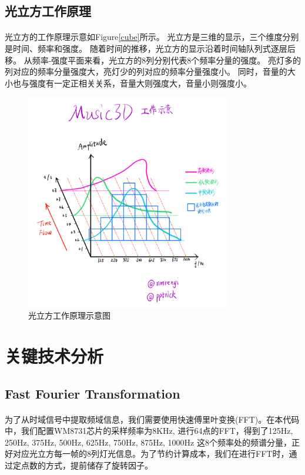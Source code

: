 \documentclass[12pt]{article}
\begin{document}
\subsection{光立方工作原理}
\paragraph{}
光立方的工作原理示意如Figure\eqref{cube}所示。
光立方是三维的显示，三个维度分别是时间、频率和强度。
随着时间的推移，光立方的显示沿着时间轴队列式逐层后移。
从频率-强度平面来看，光立方的8列分别代表8个频率分量的强度。
亮灯多的列对应的频率分量强度大，亮灯少的列对应的频率分量强度小。
同时，音量的大小也与强度有一定正相关关系，音量大则强度大，音量小则强度小。

\begin{figure}[h]
    \centering
    \label{cube}
        \includegraphics[width=0.8\textwidth]{./pic/ProjectWork.png}
        \caption{光立方工作原理示意图}
\end{figure}


\section{关键技术分析}
\subsection{Fast Fourier Transformation}
\paragraph{}为了从时域信号中提取频域信息，我们需要使用快速傅里叶变换(FFT)。在本代码中，我们配置WM8731芯片的采样频率为8KHz, 进行64点的FFT，得到了125Hz, 250Hz, 375Hz, 500Hz, 625Hz, 750Hz, 875Hz, 1000Hz
这8个频率处的频谱分量，正好对应光立方每一帧的8列灯光信息。为了节约计算成本，我们在进行FFT时，通过定点数的方式，提前储存了旋转因子。
\end{document}
